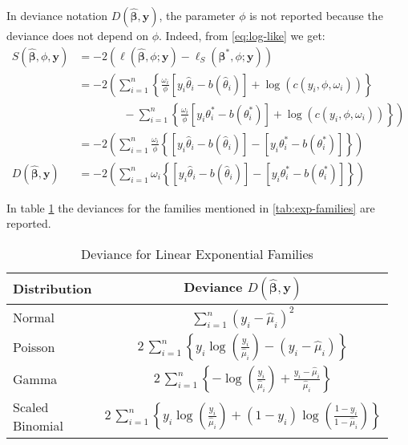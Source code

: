 \documentclass[a4paper, nobind]{templates/ociamthesis}
\theoremstyle{definition}
\theoremstyle{definition}
\theoremstyle{definition}
\theoremstyle{remark}
\begin{document}
In deviance notation \(D(\hat{\boldsymbol{\beta}}, \boldsymbol{y})\), the parameter \(\phi\) is not reported because the deviance does not depend on \(\phi\). Indeed, from \eqref{eq:log-like} we get:
\begin{align*}
S(\hat{\boldsymbol{\beta}}, \phi, \boldsymbol{y})
& =
-2\left(
\ell\left(\hat{\boldsymbol{\beta}}, \phi; \boldsymbol{y}\right)
- \ell_{S}\left(\boldsymbol{\beta}^*, \phi; \boldsymbol{y}\right)
\right)
\\ & =
-2\left(
\sum_{i=1}^{n}{
\left\{
\frac{\omega_i}{\phi} \left[y_i\hat{\theta}_i - b(\hat{\theta}_i) \right] + \log{\left(c(y_i, \phi, \omega_i)\right)}
\right\}
}
\right.
\\ & \qquad \qquad -
\left.
\sum_{i=1}^{n}{
\left\{
\frac{\omega_i}{\phi} \left[y_i\theta_i^* - b(\theta_i^*) \right] + \log{\left(c(y_i, \phi, \omega_i)\right)}
\right\}
}
\right)
\\ & =
-2\left(
\sum_{i=1}^{n}{
\frac{\omega_i}{\phi}
\left\{
\left[y_i\hat{\theta}_i - b(\hat{\theta}_i) \right]
- \left[y_i\theta_i^* - b(\theta_i^*) \right]
\right\}
}
\right)
%
\\[12pt]
%
D(\hat{\boldsymbol{\beta}}, \boldsymbol{y})
& =
-2\left(
\sum_{i=1}^{n}{
\omega_i
\left\{
\left[y_i\hat{\theta}_i - b(\hat{\theta}_i) \right]
- \left[y_i\theta_i^* - b(\theta_i^*) \right]
\right\}
}
\right)
\end{align*}

In table \ref{tab:deviance} the deviances for the families mentioned in \ref{tab:exp-families} are reported.

\begin{table}[!h]

\caption{\label{tab:deviance}Deviance for Linear Exponential Families}
\centering
\begin{tabular}[t]{lc}
\toprule
\textbf{Distribution} & \textbf{Deviance $D(\hat{\boldsymbol{\beta}}, \boldsymbol{y})$}\\
\toprule\addlinespace
Normal & $\sum_{i=1}^{n}{\left( y_i - \hat{\mu}_i \right)^2}$\\
\addlinespace\hline\addlinespace
Poisson & $2\,\sum_{i=1}^{n}{\left\{ y_i \log{\left(\frac{y_i}{\hat{\mu}_i}\right)} - \left( y_i - \hat{\mu}_i \right) \right\}}$\\
\addlinespace\hline\addlinespace
Gamma & $2\,\sum_{i=1}^{n}{\left\{ - \log{\left(\frac{y_i}{\hat{\mu}_i}\right)} + \frac{ y_i - \hat{\mu}_i }{\hat{\mu}_i} \right\}}$\\
\addlinespace\hline\addlinespace
\makecell[l]{Scaled\\Binomial} & $2\,\sum_{i=1}^{n}{\left\{ y_i \log{\left(\frac{y_i}{\hat{\mu}_i}\right)}+ \left(1-y_i\right) \log{\left(\frac{1-y_i}{1-\hat{\mu}_i}\right)} \right\}}$\\
\bottomrule
\end{tabular}
\end{table}
\end{document}
